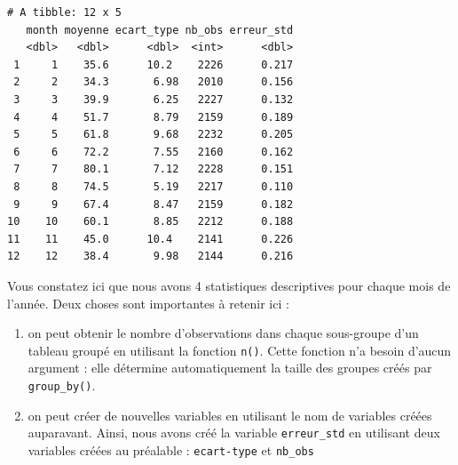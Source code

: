 \documentclass[a4paperpaper,]{article}
\newenvironment{Shaded}{\begin{snugshade}}{\end{snugshade}}
\newcommand{\DataTypeTok}[1]{\textcolor[rgb]{0.00,0.34,0.68}{#1}}
\newcommand{\KeywordTok}[1]{\textcolor[rgb]{0.12,0.11,0.11}{\textbf{#1}}}
\newcommand{\NormalTok}[1]{\textcolor[rgb]{0.12,0.11,0.11}{#1}}
\newcommand{\OperatorTok}[1]{\textcolor[rgb]{0.12,0.11,0.11}{#1}}
\newcommand{\OtherTok}[1]{\textcolor[rgb]{0.00,0.43,0.16}{#1}}
\newcommand{\StringTok}[1]{\textcolor[rgb]{0.75,0.01,0.01}{#1}}
\providecommand{\tightlist}{%
  \setlength{\itemsep}{0pt}\setlength{\parskip}{0pt}}
\theoremstyle{definition}
\theoremstyle{definition}
\theoremstyle{definition}
\theoremstyle{remark}
\begin{document}
\begin{Shaded}
\end{Shaded}

\begin{verbatim}
# A tibble: 12 x 5
   month moyenne ecart_type nb_obs erreur_std
   <dbl>   <dbl>      <dbl>  <int>      <dbl>
 1     1    35.6      10.2    2226      0.217
 2     2    34.3       6.98   2010      0.156
 3     3    39.9       6.25   2227      0.132
 4     4    51.7       8.79   2159      0.189
 5     5    61.8       9.68   2232      0.205
 6     6    72.2       7.55   2160      0.162
 7     7    80.1       7.12   2228      0.151
 8     8    74.5       5.19   2217      0.110
 9     9    67.4       8.47   2159      0.182
10    10    60.1       8.85   2212      0.188
11    11    45.0      10.4    2141      0.226
12    12    38.4       9.98   2144      0.216
\end{verbatim}

Vous constatez ici que nous avons 4 statistiques descriptives pour
chaque mois de l'année. Deux choses sont importantes à retenir ici :

\begin{enumerate}
\def\labelenumi{\arabic{enumi}.}
\tightlist
\item
  on peut obtenir le nombre d'observations dans chaque sous-groupe d'un
  tableau groupé en utilisant la fonction \texttt{n()}. Cette fonction
  n'a besoin d'aucun argument : elle détermine automatiquement la taille
  des groupes créés par \texttt{group\_by()}.
\item
  on peut créer de nouvelles variables en utilisant le nom de variables
  créées auparavant. Ainsi, nous avons créé la variable
  \texttt{erreur\_std} en utilisant deux variables créées au préalable :
  \texttt{ecart-type} et \texttt{nb\_obs}
\end{enumerate}
\end{document}
